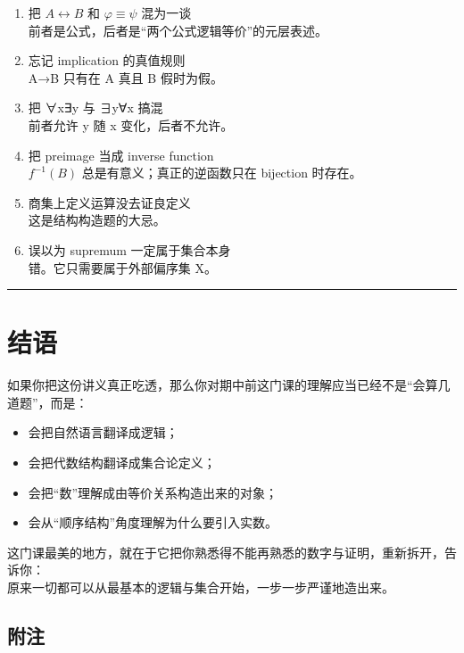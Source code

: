 \documentclass[
  11pt,
]{article}
\providecommand{\tightlist}{%
  \setlength{\itemsep}{0pt}\setlength{\parskip}{0pt}}
\begin{document}
\begin{enumerate}
\def\labelenumi{\arabic{enumi}.}
\item
  把 \(A\leftrightarrow B\) 和 \(\varphi\equiv\psi\) 混为一谈\\
  前者是公式，后者是``两个公式逻辑等价''的元层表述。
\item
  忘记 implication 的真值规则\\
  A→B 只有在 A 真且 B 假时为假。
\item
  把 ∀x∃y 与 ∃y∀x 搞混\\
  前者允许 y 随 x 变化，后者不允许。
\item
  把 preimage 当成 inverse function\\
  \(f^{-1}(B)\) 总是有意义；真正的逆函数只在 bijection 时存在。
\item
  商集上定义运算没去证良定义\\
  这是结构构造题的大忌。
\item
  误以为 supremum 一定属于集合本身\\
  错。它只需要属于外部偏序集 X。
\end{enumerate}

\begin{center}\rule{0.5\linewidth}{0.5pt}\end{center}

\section{结语}\label{ux7ed3ux8bed}

如果你把这份讲义真正吃透，那么你对期中前这门课的理解应当已经不是``会算几道题''，而是：

\begin{itemize}
\tightlist
\item
  会把自然语言翻译成逻辑；
\item
  会把代数结构翻译成集合论定义；
\item
  会把``数''理解成由等价关系构造出来的对象；
\item
  会从``顺序结构''角度理解为什么要引入实数。
\end{itemize}

这门课最美的地方，就在于它把你熟悉得不能再熟悉的数字与证明，重新拆开，告诉你：\\
原来一切都可以从最基本的逻辑与集合开始，一步一步严谨地造出来。

\subsection{附注}\label{ux9644ux6ce8}
\end{document}
